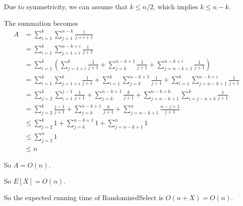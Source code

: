 \documentclass[11pt]{article}
\begin{document}
\begin{comment}
So we can see that whichever the case is, $\exists k' \le n/2$ such that
 $$A = \sum_{i=n-k'+2}^{n+1}{\lg{i}} - \sum_{i=3}^{k'+2}{\lg{i}}$$

Now we can drop the lower term

$$
\begin{aligned}
A & = \sum_{i=n-k'+2}^{n+1}{\lg{i}} - \sum_{i=3}^{k'+2}{\lg{i}} \\
 & \le \sum_{i=n-k'+2}^{n+1}{\lg{i}} \\
 & \le \sum_{i=n-\lfloor\frac{n}2\rfloor+2}^{n+1}{\lg{i}} \\
 & \le \sum_{i=\lceil\frac{n}2\rceil}^{n+1}{\lg{i}} \\
 0/0
\end{aligned}
$$
\end{comment}

Due to symmetricity, we can assume that $k \le n/2$, which implies $k \le n-k$. 

The summation becomes
$$
\begin{aligned}
A & = 
	\sum_{i=1}^k{\sum_{j=1}^{n-k}{\displaystyle\frac{1}{j+i+1}}} \\
& = \sum_{i=1}^k{\sum_{j=1+i}^{n-k+i}{\displaystyle\frac{1}{j+1}}} \\
& = \sum_{i=1}^k{\left(
		\sum_{j=1+i}^{k}{\displaystyle\frac{1}{j+1}} + 
		\sum_{j=k}^{n-k+1}{\displaystyle\frac{1}{j+1}} + 
		\sum_{j=n-k+1}^{n-k+i}{\displaystyle\frac{1}{j+1}}
	\right)} \\
& = \sum_{i=1}^k{\sum_{j=1+i}^{k}{\displaystyle\frac{1}{j+1}}} + 
	\sum_{i=1}^k{\sum_{j=k}^{n-k+1}{\displaystyle\frac{1}{j+1}}} + 
	\sum_{i=1}^k{\sum_{j=n-k+1}^{n-k+i}{\displaystyle\frac{1}{j+1}}} \\
& = \sum_{j=2}^k{\sum_{i=1}^{j-1}{\displaystyle\frac{1}{j+1}}} + 
	\sum_{j=k}^{n-k+1}{\displaystyle\frac{k}{j+1}} + 
	\sum_{j=n-k+1}^{n-k+k}{\sum_{i=j-n+k}^{k}{\displaystyle\frac{1}{j+1}}} \\
& = \sum_{j=2}^k{\displaystyle\frac{j-1}{j+1}} + 
	\sum_{j=k}^{n-k+1}{\displaystyle\frac{k}{j+1}} + 
	\sum_{j=n-k+1}^{n}{\displaystyle\frac{n-j+1}{j+1}} \\
& \le \sum_{j=2}^k{1} + 
	\sum_{j=k}^{n-k+1}{1} + 
	\sum_{j=n-k+1}^{n}{1} \\
& \le \sum_{j=2}^n{1} \\
& \le n
\end{aligned}
$$

So $A = O(n)$. 

So $E[X] = O(n)$. 

So the expected running time of RandomizedSelect is $O(n + X) = O(n)$. 
\end{document}
